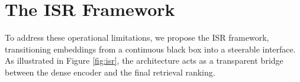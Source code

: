 \documentclass[sigconf,anonymous,screen]{acmart}
\begin{document}
\begin{table}[htbp]
\begin{minipage}{0.48\textwidth}
\centering
\caption{Hyperparameter Tradeoff Analysis (SciDocs)}
\label{tab:hyperparam}
\end{minipage}
\hfill
\begin{minipage}{0.48\textwidth}
\centering
\caption{Ablation Study on ISR Components (SciDocs)}
\label{tab:ablation}
\end{minipage}
\vspace{-10pt}
\end{table}

\section{The ISR Framework}
To address these operational limitations, we propose the ISR framework, transitioning embeddings from a continuous black box into a steerable interface. As illustrated in Figure \ref{fig:isr}, the architecture acts as a transparent bridge between the dense encoder and the final retrieval ranking.
\end{document}
